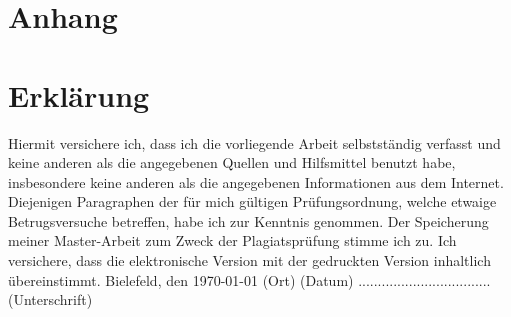 \documentclass[
        ngerman,
        paper=a4,
        numbers=noendperiod,
]{scrreprt}
\begin{document}
\appendix 
\chapter{Anhang}
\label{chapter:Anhang}%


\clearpage
        
        
        




\chapter*{Erklärung}
Hiermit versichere ich, dass ich die vorliegende Arbeit selbstständig verfasst und keine anderen als die angegebenen Quellen und Hilfsmittel benutzt habe, insbesondere keine anderen als die angegebenen Informationen aus dem Internet. Diejenigen Paragraphen der für mich gültigen Prüfungsordnung, welche etwaige Betrugsversuche betreffen, habe ich zur Kenntnis genommen. Der Speicherung meiner Master-Arbeit zum Zweck der Plagiatsprüfung stimme ich zu. Ich versichere, dass die elektronische Version mit der gedruckten Version inhaltlich übereinstimmt.\newline
\linebreak
\linebreak
\linebreak
Bielefeld, den \today\newline
(Ort) (Datum)\newline
\linebreak
\linebreak
\linebreak
..................................\newline
(Unterschrift)
\end{document}
